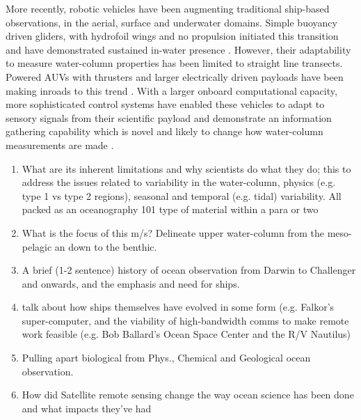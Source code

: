 \documentclass[12pt]{article}
\begin{document}
More recently, robotic vehicles have been augmenting traditional
ship-based observations, in the aerial, surface and underwater
domains. Simple buoyancy driven gliders, with hydrofoil wings and no
propulsion initiated this transition and have demonstrated sustained
in-water presence \cite{rucool11}. However, their adaptability to
measure water-column properties has been limited to straight line
transects. Powered AUVs with thrusters and larger electrically driven
payloads have been making inroads to this trend
\cite{loch89,dorado2004,Bellingham07}. With a larger onboard
computational capacity, more sophisticated control systems have
enabled these vehicles to adapt to sensory signals from their
scientific payload and demonstrate an information gathering capability
which is novel and likely to change how water-column measurements are
made
\cite{bellingham94,aosn93,bellingham00,ryan10,das11b,das15,fossum18,fossum18b}.




\begin{enumerate} 



\item What are its inherent limitations and why scientists do what
  they do; this to address the issues related to variability in the
  water-column, physics (e.g. type 1 vs type 2 regions), seasonal and
  temporal (e.g. tidal) variability. All packed as an oceanography 101
  type of material within a para or two

\item What is the focus of this m/s? Delineate upper water-column from the
meso-pelagic an down to the benthic.

\item A brief (1-2 sentence) history of ocean observation from Darwin to
Challenger and onwards, and the emphasis and need for ships.

\item talk about how ships themselves have evolved in some form
  (e.g. Falkor’s super-computer, and the viability of high-bandwidth
  comms to make remote work feasible (e.g. Bob Ballard’s Ocean Space
  Center and the R/V Nautilus)



\item Pulling apart biological from Phys., Chemical and Geological ocean
observation. 

\item How did Satellite remote sensing change the way ocean science has
been done and what impacts they've had

\end{enumerate}
\end{document}
